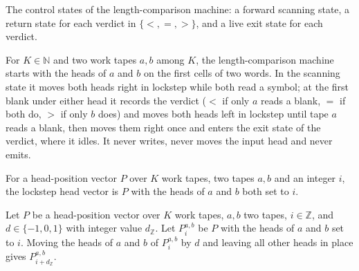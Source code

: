 \begin{definition}
\label{Turing.NTimeDiag.QyCmp}
\leanok
The control states of the length-comparison machine: a forward scanning state, a return state
for each verdict in $\{<, =, >\}$, and a live exit state for each verdict.
\end{definition}

\begin{definition}
\label{Turing.NTimeDiag.qyCmpTM}
\leanok
{}
For $K \in \mathbb{N}$ and two work tapes $a, b$ among $K$, the length-comparison machine starts
with the heads of $a$ and $b$ on the first cells of two words. In the scanning state it moves
both heads right in lockstep while both read a symbol; at the first blank under either head it
records the verdict ($<$ if only $a$ reads a blank, $=$ if both do, $>$ if only $b$ does) and
moves both heads left in lockstep until tape $a$ reads a blank, then moves them right once and
enters the exit state of the verdict, where it idles. It never writes, never moves the input head
and never emits.
\end{definition}

\begin{definition}
\label{Turing.NTimeDiag.qyAt2}
\leanok
For a head-position vector $P$ over $K$ work tapes, two tapes $a, b$ and an integer $i$, the
lockstep head vector is $P$ with the heads of $a$ and $b$ both set to $i$.
\end{definition}

\begin{theorem}
\label{Turing.NTimeDiag.qyAt2_move}
\leanok
{}
Let $P$ be a head-position vector over $K$ work tapes, $a, b$ two tapes, $i \in \mathbb{Z}$, and
$d \in \{-1, 0, 1\}$ with integer value $d_{\mathbb{Z}}$. Let $P^{a,b}_i$ be $P$ with the heads
of $a$ and $b$ set to $i$. Moving the heads of $a$ and $b$ of $P^{a,b}_i$ by $d$ and leaving all
other heads in place gives $P^{a,b}_{i + d_{\mathbb{Z}}}$.
\end{theorem}

